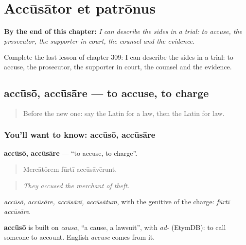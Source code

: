 
\chapter{Accūsātor et patrōnus}
\label{ch:la-accusator-et-patronus}

\begin{chapteropening}
\textbf{By the end of this chapter:} \emph{I can describe the sides in a trial: to accuse, the prosecutor, the supporter in court, the counsel and the evidence.}

Complete the last lesson of chapter 309: I can describe the sides in a trial: to accuse, the prosecutor, the supporter in court, the counsel and the evidence.
\end{chapteropening}

\section[accūsō, accūsāre]{accūsō, accūsāre — to accuse, to charge}

\label{lesson:LA-C309-accuso}



\begin{quote}
Before the new one: say the Latin for a law, then the Latin for law.
\end{quote}

\subsection*{You'll want to know: accūsō, accūsāre}
\textbf{accūsō, accūsāre} — \textquotedblleft{}to accuse, to charge\textquotedblright{}.

\begin{quote}
Mercātōrem fūrtī accūsāvērunt.
\end{quote}

\begin{quote}
\emph{They accused the merchant of theft.}
\end{quote}

\emph{accūsō, accūsāre, accūsāvī, accūsātum}, with the genitive of the charge: \emph{fūrtī accūsāre}.

\begin{cousinweb}
\textbf{accūsō} is built on \emph{causa}, \textquotedblleft{}a cause, a lawsuit\textquotedblright{}, with \emph{ad-} (EtymDB): to call someone to account. English \emph{accuse} comes from it.
\end{cousinweb}

